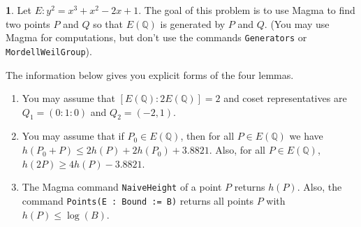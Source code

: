 \documentclass[12pt]{article}
\theoremstyle{definition}
\newtheorem{ex}{}
\begin{document}
\begin{ex}
	Let $E : y^{2} = x^{3} + x^{2} - 2x + 1$. The goal of this problem is to use Magma
	to find two points $P$ and $Q$ so that $E(\mathbb{Q})$ is generated by $P$ and $Q$. (You may use Magma for computations, but don't use the commands {\tt Generators}
	or {\tt MordellWeilGroup}).

	The information below gives you explicit forms of the four lemmas.

	\begin{enumerate}[label=(\alph*)]
		\item You may assume that $[E(\mathbb{Q}) : 2E(\mathbb{Q})] = 2$ and coset representatives are
		      $Q_{1} = (0 : 1 : 0)$ and $Q_{2} = (-2,1)$.
		\item You may assume that if $P_{0} \in E(\mathbb{Q})$, then for all $P \in E(\mathbb{Q})$ we have
		      $h(P_{0} + P) \leq 2h(P) + 2h(P_{0}) + 3.8821$.
		      Also, for all $P \in E(\mathbb{Q})$, $h(2P) \geq 4h(P) - 3.8821$.
		\item The Magma command {\tt NaiveHeight} of a point $P$ returns $h(P)$.
		      Also, the command \verb+Points(E : Bound := B)+ returns all points $P$
		      with $h(P) \leq \log(B)$.
	\end{enumerate}
\end{ex}
\end{document}
